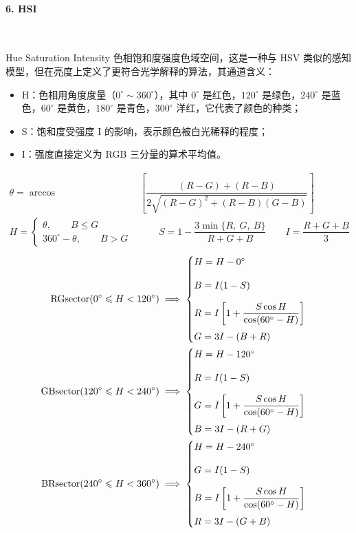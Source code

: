\documentclass{article}
\begin{document}
\paragraph*{6. HSI}~{}

Hue Saturation Intensity 色相饱和度强度色域空间，这是一种与 HSV 类似的感知模型，但在亮度上定义了更符合光学解释的算法，其通道含义：

\begin{itemize}
    \item H：色相用角度度量（$0^{\circ}\sim360^{\circ}$），其中 $0^{\circ}$ 是红色，$120^{\circ}$ 是绿色，$240^{\circ}$ 是蓝色，$60^{\circ}$ 是黄色，$180^{\circ}$ 是青色，$300^{\circ}$ 洋红，它代表了颜色的种类；
    \item S：饱和度受强度 I 的影响，表示颜色被白光稀释的程度；
    \item I：强度直接定义为 RGB 三分量的算术平均值。
\end{itemize}
\begin{align*}
    \theta=\arccos&\left[\dfrac{\displaystyle(R-G)+(R-B)}{\displaystyle2\sqrt{(R-G)^2+(R-B)(G-B)}} \right]
    \\
    H=\begin{cases}
        \theta,\qquad B\leqslant G
        \\[10pt]
        360^{\circ}-\theta,\qquad B>G
    \end{cases}&\qquad S=1-\dfrac{3\min\{R,\ G,\ B\}}{R+G+B}\qquad I=\dfrac{R+G+B}{3}
\end{align*}
\vspace*{-1em}
\begin{align*}
    {\rm RG sector}(0^{\circ}\leqslant H<120^{\circ})&\implies\begin{cases}
        H=H-0^{\circ}
        \\[10pt]
        B=I(1-S)
        \\[10pt]
        R=I\left[1+\dfrac{S\cos H}{\cos(60^{\circ}-H)}\right]
        \\[10pt]
        G=3I-(B+R)
    \end{cases}
    \\
    {\rm GB sector}(120^{\circ}\leqslant H<240^{\circ})&\implies\begin{cases}
        H=H-120^{\circ}
        \\[10pt]
        R=I(1-S)
        \\[10pt]
        G=I\left[1+\dfrac{S\cos H}{\cos(60^{\circ}-H)}\right]
        \\[10pt]
        B=3I-(R+G)
    \end{cases}
    \\
    {\rm BR sector}(240^{\circ}\leqslant H<360^{\circ})&\implies\begin{cases}
        H=H-240^{\circ}
        \\[10pt]
        G=I(1-S)
        \\[10pt]
        B=I\left[1+\dfrac{S\cos H}{\cos(60^{\circ}-H)}\right]
        \\[10pt]
        R=3I-(G+B)
    \end{cases}
\end{align*}
\end{document}
